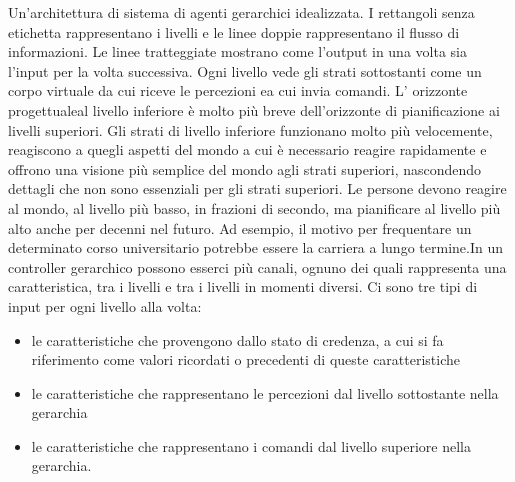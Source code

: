 \documentclass[a4paper]{extarticle}
\begin{document}
Un'architettura di sistema di agenti gerarchici idealizzata. I rettangoli senza etichetta rappresentano i livelli e le linee doppie rappresentano il flusso di informazioni. Le linee tratteggiate mostrano come l'output in una volta sia l'input per la volta successiva. Ogni livello vede gli strati sottostanti come un corpo virtuale da cui riceve le percezioni ea cui invia comandi. L' orizzonte progettualeal livello inferiore è molto più breve dell'orizzonte di pianificazione ai livelli superiori. Gli strati di livello inferiore funzionano molto più velocemente, reagiscono a quegli aspetti del mondo a cui è necessario reagire rapidamente e offrono una visione più semplice del mondo agli strati superiori, nascondendo dettagli che non sono essenziali per gli strati superiori. Le persone devono reagire al mondo, al livello più basso, in frazioni di secondo, ma pianificare al livello più alto anche per decenni nel futuro. Ad esempio, il motivo per frequentare un determinato corso universitario potrebbe essere la carriera a lungo termine.In un controller gerarchico possono esserci più canali, ognuno dei quali rappresenta una caratteristica, tra i livelli e tra i livelli in momenti diversi. Ci sono tre tipi di input per ogni livello alla volta:
\begin{itemize}
\item le caratteristiche che provengono dallo stato di credenza, a cui si fa riferimento come valori ricordati o precedenti di queste caratteristiche
\item le caratteristiche che rappresentano le percezioni dal livello sottostante nella gerarchia
\item le caratteristiche che rappresentano i comandi dal livello superiore nella gerarchia.
\end{itemize} 
\end{document}
